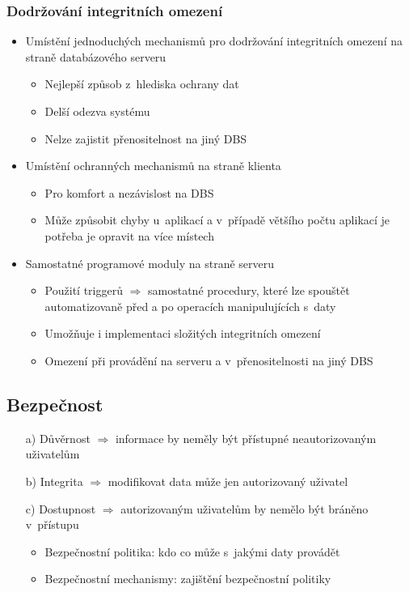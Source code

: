 \documentclass[a4paper,10pt]{article}
\newcommand{\tedy}{$\Rightarrow$ }
\begin{document}
			\subsubsection{Dodržování integritních omezení}
				\begin{itemize}
					\item Umístění jednoduchých mechanismů pro dodržování integritních omezení na straně databázového serveru
					\begin{itemize}
						\item Nejlepší způsob z~hlediska ochrany dat
						\item Delší odezva systému
						\item Nelze zajistit přenositelnost na jiný DBS
					\end{itemize}
					\item Umístění ochranných mechanismů na straně klienta
					\begin{itemize}
						\item Pro komfort a nezávislost na DBS
						\item Může způsobit chyby u~aplikací a v~případě většího počtu aplikací je potřeba je opravit na více místech
					\end{itemize}
					\item Samostatné programové moduly na straně serveru
					\begin{itemize}
						\item Použití triggerů \tedy samostatné procedury, které lze spouštět automatizovaně před a po operacích manipulujících s~daty
						\item Umožňuje i implementaci složitých integritních omezení
						\item Omezení při provádění na serveru a v~přenositelnosti na jiný DBS
					\end{itemize}
				\end{itemize}

		\subsection{Bezpečnost}
			\begin{itemize}
				\item[a)] Důvěrnost \tedy informace by neměly být přístupné neautorizovaným uživatelům
				\item[b)] Integrita \tedy modifikovat data může jen autorizovaný uživatel
				\item[c)] Dostupnost \tedy autorizovaným uživatelům by nemělo být bráněno v~přístupu
				\begin{itemize}
					\item Bezpečnostní politika: kdo co může s~jakými daty provádět
					\item Bezpečnostní mechanismy: zajištění bezpečnostní politiky
				\end{itemize}	
			\end{itemize}
\end{document}
